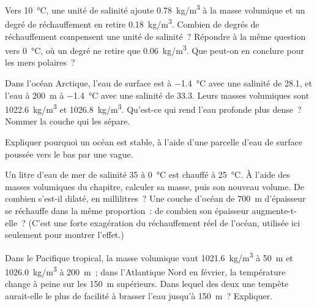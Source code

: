 \begin{exercise}[$\star\star$]\label{exo:g10:layered-ocean:9}
Vers \qty{10}{\degreeCelsius}, une unité de salinité ajoute
\qty{0.78}{kg/m^3} à la masse volumique et un degré de réchauffement en
retire \qty{0.18}{kg/m^3}. Combien de degrés de réchauffement compensent une
unité de salinité~? Répondre à la même question vers
\qty{0}{\degreeCelsius}, où un degré ne retire que \qty{0.06}{kg/m^3}. Que
peut-on en conclure pour les mers polaires~?
\end{exercise}

\begin{exercise}[$\star\star$]\label{exo:g10:layered-ocean:10}
Dans l'océan Arctique, l'eau de surface est à \qty{-1.4}{\degreeCelsius}
avec une salinité de 28.1, et l'eau à \qty{200}{m} à
\qty{-1.4}{\degreeCelsius} avec une salinité de 33.3. Leurs masses
volumiques sont \qty{1022.6}{kg/m^3} et \qty{1026.8}{kg/m^3}. Qu'est-ce qui
rend l'eau profonde plus dense~? Nommer la couche qui les sépare.
\end{exercise}

\begin{exercise}[$\star\star$]\label{exo:g10:layered-ocean:11}
Expliquer pourquoi un océan  est stable, à l'aide d'une parcelle
d'eau de surface poussée vers le bas par une vague.
\end{exercise}

\begin{exercise}[$\star\star\star$]\label{exo:g10:layered-ocean:12}
Un litre d'eau de mer de salinité 35 à \qty{0}{\degreeCelsius} est chauffé
à \qty{25}{\degreeCelsius}. À l'aide des masses volumiques du chapitre,
calculer sa masse, puis son nouveau volume. De combien s'est-il dilaté, en
millilitres~? Une couche d'océan de \qty{700}{m} d'épaisseur se réchauffe
dans la même proportion~: de combien son épaisseur augmente-t-elle~? (C'est
une forte exagération du réchauffement réel de l'océan, utilisée ici
seulement pour montrer l'effet.)
\end{exercise}

\begin{exercise}[$\star\star\star$]\label{exo:g10:layered-ocean:13}
Dans le Pacifique tropical, la masse volumique vaut \qty{1021.6}{kg/m^3} à
\qty{50}{m} et \qty{1026.0}{kg/m^3} à \qty{200}{m}~; dans l'Atlantique Nord
en février, la température change à peine sur les \qty{150}{m} supérieurs.
Dans lequel des deux une tempête aurait-elle le plus de facilité à brasser
l'eau jusqu'à \qty{150}{m}~? Expliquer.
\end{exercise}

